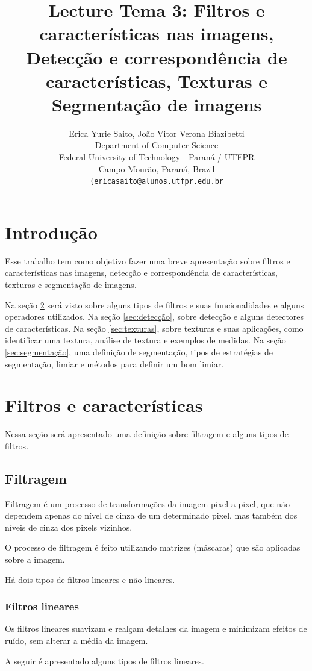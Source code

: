 \documentclass{article}
\title{Lecture Tema 3: Filtros e características nas imagens, Detecção e correspondência de características, Texturas e Segmentação de imagens}
\author{
  Erica Yurie Saito, João Vitor Verona Biazibetti \\
  Department of Computer Science\\
  Federal University of Technology - Paran\'{a} / UTFPR\\
  Campo Mour\~{a}o, Paran\'{a}, Brazil \\
  \texttt{\{ericasaito@alunos.utfpr.edu.br} \\
}
\begin{document}
\maketitle

\section{Introdução}
Esse trabalho tem como objetivo fazer uma breve apresentação sobre filtros e características nas imagens, detecção e correspondência de características, texturas e segmentação de imagens.  \par Na seção \ref{sec:filtros} será visto sobre alguns tipos de filtros e suas funcionalidades e alguns operadores utilizados. Na seção \ref{sec:detecção}, sobre detecção e alguns detectores de características. Na seção \ref{sec:texturas}, sobre texturas e suas aplicações, como identificar uma textura, análise de textura e exemplos de medidas. Na seção \ref{sec:segmentação}, uma definição de segmentação, tipos de estratégias de segmentação, limiar e métodos para definir um bom limiar. 

\section{Filtros e características}
\label{sec:filtros}
Nessa seção será apresentado uma definição sobre filtragem e alguns tipos de filtros. 
\subsection{Filtragem}
Filtragem é um processo de transformações da imagem pixel a pixel, que não dependem apenas do nível de cinza de um determinado pixel, mas também dos níveis de cinza dos pixels vizinhos. 
\par O processo de filtragem é feito utilizando matrizes (máscaras) que são aplicadas sobre a
imagem.
\par Há dois tipos de filtros lineares e não lineares.

\subsubsection{Filtros lineares}
Os filtros lineares suavizam e realçam detalhes da imagem e minimizam efeitos de ruído, sem alterar a média da imagem.
\par A seguir é apresentado alguns tipos de filtros lineares.
\end{document}
